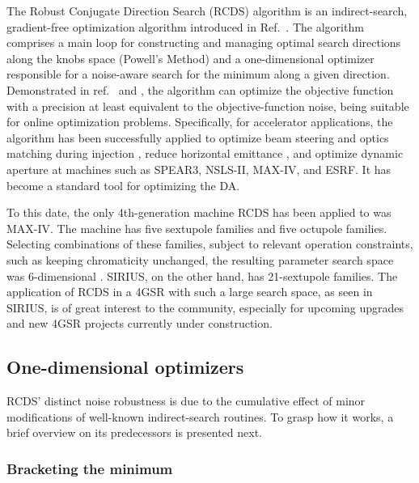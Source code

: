 The Robust Conjugate Direction Search (RCDS) algorithm is an indirect-search, gradient-free optimization algorithm introduced in Ref.~\cite{huang_algorithm_2013}. The algorithm comprises a main loop for constructing and managing optimal search directions along the knobs space (Powell's Method) and a one-dimensional optimizer responsible for a noise-aware search for the minimum along a given direction. Demonstrated in ref.~\cite{huang_algorithm_2013} and \cite[section 7.3.3]{huang_beam-based_2019}, the algorithm can optimize the objective function with a precision at least equivalent to the objective-function noise, being suitable for online optimization problems. Specifically, for accelerator applications, the algorithm has been successfully applied to optimize beam steering and optics matching during injection \cite{huang_algorithm_2013}, reduce horizontal emittance \cite{huang_algorithm_2013, huang_online_2015}, and optimize dynamic aperture \cite{huang_algorithm_2013, huang_online_2015,liuzzo_rcds_2016,olsson_online_2018,yang_online_2022} at machines such as SPEAR3, NSLS-II, MAX-IV, and ESRF. It has become a standard tool for optimizing the DA.

To this date, the only 4th-generation machine RCDS has been applied to was MAX-IV. The machine has five sextupole families and five octupole families. Selecting combinations of these families, subject to relevant operation constraints, such as keeping chromaticity unchanged, the resulting parameter search space was 6-dimensional \cite{olsson_online_2018}. SIRIUS, on the other hand, has 21-sextupole families. The application of RCDS in a 4GSR with such a large search space, as seen in SIRIUS, is of great interest to the community, especially for upcoming upgrades and new 4GSR projects currently under construction.

\subsection{One-dimensional optimizers}
RCDS' distinct noise robustness is due to the cumulative effect of minor modifications of well-known indirect-search routines. To grasp how it works, a brief overview on its predecessors is presented next.
\subsubsection{Bracketing the minimum}



